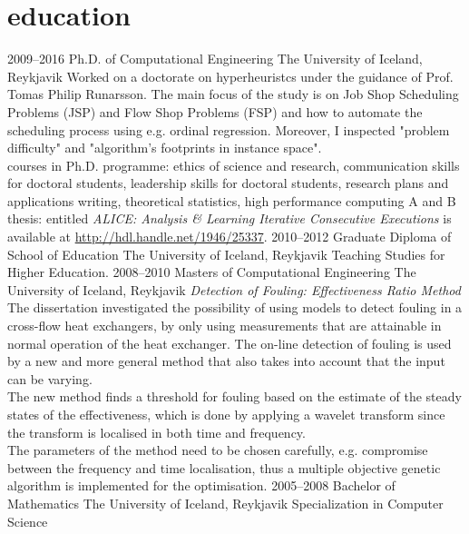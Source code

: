 \documentclass[]{cv} %
\begin{document}
\section{education}
\begin{entrylist}
\entry
{2009--2016}
{Ph.D. {\normalfont of Computational Engineering}}
{The University of Iceland, Reykjavik}
{Worked on a doctorate on hyperheuristcs under the guidance of Prof. Tomas 
Philip Runarsson. The main focus of the study is on Job Shop Scheduling 
Problems (JSP) and Flow Shop Problems (FSP) and how to automate the scheduling 
process using e.g. ordinal regression. Moreover, I inspected "problem 
difficulty" and "algorithm's footprints in instance space". \\
{\boldfont courses in Ph.D. programme:} 
ethics of science and research, communication skills for doctoral students, leadership skills for doctoral students, research plans and applications writing, theoretical statistics, high performance computing A and B  \\
{\boldfont thesis:} entitled \emph{ALICE: Analysis \& Learning Iterative 
Consecutive Executions} is available at \url{http://hdl.handle.net/1946/25337}.}
\entry
{2010--2012}
{Graduate Diploma {\normalfont of School of Education}}
{The University of Iceland, Reykjavik}
{Teaching Studies for Higher Education.}
\entry
{2008--2010}
{Masters {\normalfont of Computational Engineering}}
{The University of Iceland, Reykjavik}
{\emph{Detection of Fouling: Effectiveness Ratio Method} \\ 
The dissertation investigated the possibility of using models to detect fouling in a cross-flow heat exchangers, by only using measurements that are attainable in normal operation of the heat exchanger.  The on-line detection of fouling is used by a new and more general method that also takes into account that the input can be varying. \\
The new method finds a threshold for fouling based on the estimate of the steady states of the effectiveness, which is done by applying a wavelet transform since the transform is localised in both time and frequency. \\
The parameters of the method need to be chosen carefully, e.g. compromise between the frequency and time localisation, thus a multiple objective genetic algorithm is implemented for the optimisation. }
\entry
{2005--2008}
{Bachelor {\normalfont of Mathematics}}
{The University of Iceland, Reykjavik}
{Specialization in Computer Science}
\end{entrylist}
\end{document}
